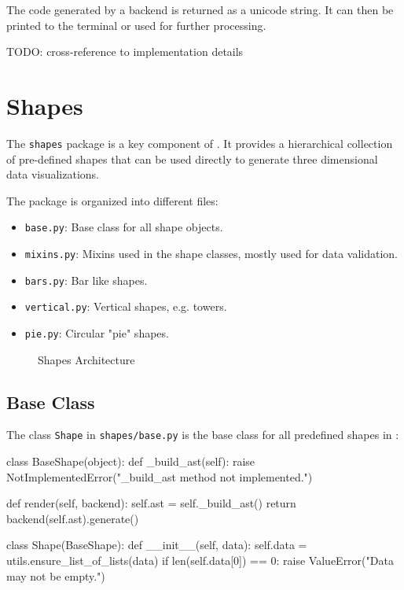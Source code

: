 \noindent The code generated by a backend is returned as a unicode string. It
can then be printed to the terminal or used for further processing.


TODO: cross-reference to implementation details


\section{Shapes}\label{sec:shapes}

The \texttt{shapes} package is a key component of \tangible{}. It provides a
hierarchical collection of pre-defined shapes that can be used directly to
generate three dimensional data visualizations.

The package is organized into different files:

\begin{itemize}
	\item \texttt{base.py}: Base class for all shape objects.
	\item \texttt{mixins.py}: Mixins used in the shape classes, mostly used for
		data validation.
	\item \texttt{bars.py}: Bar like shapes.
	\item \texttt{vertical.py}: Vertical shapes, e.g. towers.
	\item \texttt{pie.py}: Circular "pie" shapes.
\end{itemize}

\begin{figure}[H]
	\centering
	
	\caption{Shapes Architecture}
	\label{img:shapes}
\end{figure}

\subsection{Base Class}

The class \texttt{Shape} in \texttt{shapes/base.py} is the base class for all
predefined shapes in \tangible{}:

\vspace{.5\baselineskip}

\begin{pythoncode}
class BaseShape(object):
    def _build_ast(self):
        raise NotImplementedError("_build_ast method not implemented.")

    def render(self, backend):
        self.ast = self._build_ast()
        return backend(self.ast).generate()
    
class Shape(BaseShape):
    def __init__(self, data):
        self.data = utils.ensure_list_of_lists(data)
        if len(self.data[0]) == 0:
            raise ValueError("Data may not be empty.")
\end{pythoncode}

